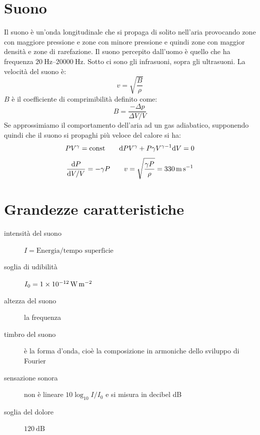 \section{Suono}
Il suono è un'onda longitudinale che si propaga di solito nell'aria provocando zone con maggiore pressione e zone con minore pressione e quindi zone con maggior densità e zone di rarefazione. Il suono percepito dall'uomo è quello che ha frequenza $\SIrange{20}{20000}{\hertz}$. Sotto ci sono gli infrasuoni, sopra gli ultrasuoni. La velocità del suono è:
\begin{equation}
   v=\sqrt{\frac{B}{\rho}}
\end{equation}
$B$ è il coefficiente di comprimibilità definito come:
\begin{equation}
   B=\frac{-\Delta p}{\Delta V/V}
\end{equation}
Se approssimiamo il comportamento dell'aria ad un gas adiabatico, supponendo quindi che il suono si propaghi più veloce del calore si ha:
\[PV^\gamma=\text{const}\qquad \mathrm{d} PV^\gamma+P\gamma V^{\gamma-1}\mathrm{d} V=0\]
\[\frac{\mathrm{d} P}{\mathrm{d} V/V}=-\gamma P\qquad v=\sqrt{\frac{\gamma P}{\rho}}=\SI{330}{\metre\per\second} \]
\section{Grandezze caratteristiche}
\begin{description}
   \item[intensità del suono] $I=\text{Energia}/\text{tempo superficie}$\\
   \item[soglia di udibilità] $I_0=\SI{1E-12}{\watt\per\meter\squared}$\\
      \item[altezza del suono]la frequenza\\
   \item[timbro del suono] è la forma d'onda, cioè la composizione in armoniche dello sviluppo di Fourier\\
   \item[sensazione sonora] non è lineare $10\log_{10} I/I_0$ e si misura in decibel \si{\deci\bel}\\
   \item[soglia del dolore] $\SI{120}{\deci\bel}$\\
\end{description}





























